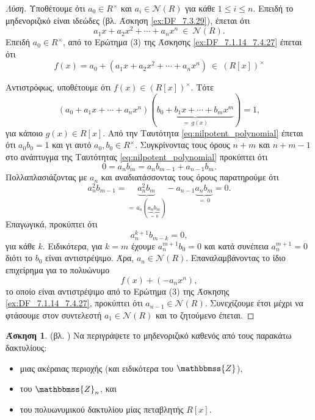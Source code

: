 \documentclass[12pt,a4paper,reqno]{amsart}
\theoremstyle{definition}
\newtheorem{exercise}{Άσκηση}
\newcommand{\ZZ}{\mathbbmss{Z}}
\newcommand{\nN}{\mathcal{N}}
\begin{document}
\begin{proof}[Λύση]
  Υποθέτουμε ότι $a_0 \in R^\times$ και $a_i \in \nN(R)$ για κάθε $1 \le i \le n$. Επειδή το μηδενοριζικό είναι ιδεώδες (βλ. Άσκηση \ref{ex:DF_7.3.29}), έπεται ότι 
  \[
  a_1x + a_2x^2 + \cdots + a_nx^n \ \in \ \nN(R).
  \]
  Επειδή $a_0 \in R^\times$, από το Ερώτημα (3) της Άσκησης \ref{ex:DF_7.1.14_7.4.27} έπεται ότι 
  \[
  f(x) = a_0 + (a_1x + a_2x^2 + \cdots + a_nx^n) \ \in \ (R[x])^\times
  \]

  Αντιστρόφως, υποθέτουμε ότι $f(x) \in (R[x])^\times$. Τότε 
  \begin{equation}
    \label{eq:nilpotent_polynomial}
    (a_0 + a_1x + \cdots + a_nx^n)(\underbrace{b_0 + b_1x + \cdots + b_mx^m}_{= \, g(x)}) = 1,
  \end{equation}
  για κάποιο $g(x) \in R[x]$. Από την Ταυτότητα \eqref{eq:nilpotent_polynomial} έπεται ότι $a_0b_0 = 1$ και γι αυτό $a_0, b_0 \in R^\times$. Συγκρίνοντας τους όρους $n+m$ και $n+m-1$ στο ανάπτυγμα της Ταυτότητας \eqref{eq:nilpotent_polynomial} προκύπτει ότι 
  \[
  0 = a_nb_m = a_nb_{m-1} + a_{n-1}b_m.
  \]
  Πολλαπλασιάζοντας με $a_n$ και αναδιατάσσοντας τους όρους παρατηρούμε ότι 
  \[
  a_n^2b_{m-1} = \underbrace{a_n^2b_m}_{=\, a_n(\underbrace{a_nb_m}_{=\,0})} - a_{n-1}\underbrace{a_nb_m}_{=\,0} = 0.
  \]
  Επαγωγικά, προκύπτει ότι 
  \[
  a^{k+1}_nb_{m-k} = 0,
  \]
  για κάθε $k$. Ειδικότερα, για $k=m$ έχουμε $a_n^{m+1}b_0 = 0$ και κατά συνέπεια $a_n^{m+1} = 0$ διότι το $b_0$ είναι αντιστρέψιμο. Άρα, $a_n \in \nN(R)$. Επαναλαμβάνοντας το ίδιο επιχείρημα για το πολυώνυμο 
  \[
  f(x) + (-a_nx^n), 
  \]
  το οποίο είναι αντιστρέψιμο από το Ερώτημα (3) της Άσκησης \ref{ex:DF_7.1.14_7.4.27}, προκύπτει ότι $a_{n-1} \in \nN(R)$. Συνεχίζουμε έτσι μέχρι να φτάσουμε στον συντελεστή $a_1 \in \nN(R)$ και το ζητούμενο έπεται.
\end{proof}

\begin{exercise}{\rm(βλ. \cite[Άσκηση~7.3.33]{DF04})}
  \label{ex:nilradicals}
  Να περιγράψετε το μηδενοριζικό καθενός από τους παρακάτω δακτυλίους:
  \begin{itemize}
    \item[(1)] μιας ακέραιας περιοχής (και ειδικότερα του $\ZZ$),
    \item[(2)] του $\ZZ_n$, και 
    \item[(3)] του πολυωνυμικού δακτυλίου μίας πεταβλητής $R[x]$.
  \end{itemize}
\end{exercise}
\end{document}
